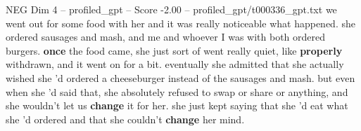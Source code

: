 \begin{textsample}{NEG Dim 4 – profiled\_gpt – Score -2.00 – profiled\_gpt/t000336\_gpt.txt}  \label{ex:f4_neg_018}
we went out for some food with her and it was really noticeable what happened. she ordered sausages and mash, and me and whoever I was with both ordered burgers. \textbf{once} the food came, she just sort of went really quiet, like \textbf{properly} withdrawn, and it went on for a bit. eventually she admitted that she actually wished she ’d ordered a cheeseburger instead of the sausages and mash. but even when she ’d said that, she absolutely refused to swap or share or anything, and she wouldn't let us \textbf{change} it for her. she just kept saying that she ’d eat what she ’d ordered and that she couldn't \textbf{change} her mind.

\end{textsample}
